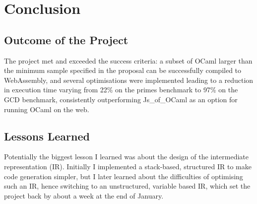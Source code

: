 \chapter{Conclusion}




\section{Outcome of the Project}
The project met and exceeded the success criteria: a subset of OCaml larger than the minimum sample specified in the proposal can be successfully compiled to WebAssembly, and several optimisations were implemented leading to a reduction in execution time varying from 22\% on the primes benchmark to 97\% on the GCD benchmark, consistently outperforming Js\_of\_OCaml as an option for running OCaml on the web.

\section{Lessons Learned}
Potentially the biggest lesson I learned was about the design of the intermediate representation (IR). Initially I implemented a stack-based, structured IR to make code generation simpler, but I later learned about the difficulties of optimising such an IR, hence switching to an unstructured, variable based IR, which set the project back by about a week at the end of January.

